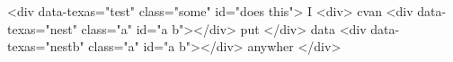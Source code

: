 <div data-texas="test" class="some" id="does this">
I
  <div>
cvan
    <div data-texas="nest" class="a" id="a b"></div>
put
  </div>
data
  <div data-texas="nestb" class="a" id="a b"></div>
anywher
</div>
